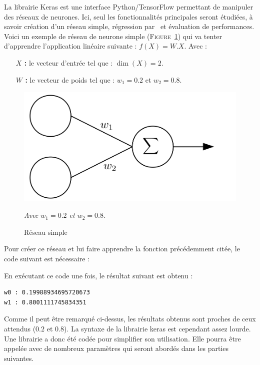La librairie Keras est une interface Python/TensorFlow\cite{tf} permettant de manipuler des réseaux de neurones.
Ici, seul les fonctionnalités principales seront étudiées,
à savoir
création d'un réseau simple,
régression par \sgd\
et évaluation de performances.\\


Voici un exemple de réseau de neurone simple (\textsc{Figure}\ \ref{fig:net2})
qui va tenter d'apprendre l'application linéaire suivante : $f(X) = W.X$.
Avec :
\begin{itemize}
    \item[\textbf{$X$ :}] le vecteur d'entrée tel que : $\dim(X) = 2$.
    \item[\textbf{$W$ :}] le vecteur de poids tel que : $w_1 = 0.2$ et $w_2 = 0.8$.
\end{itemize}
\begin{figure}[H]
    \center
    \includegraphics[height=\petit]{pict/net2.png}
	\caption{Réseau simple}
    \vspace{-10pt}
    \begin{center}
        \tiny
        \textit{
        Avec $w_1 = 0.2$ et $w_2 = 0.8$.
        }
    \end{center}
	\label{fig:net2}
\end{figure}
\vspace{-12pt}


Pour créer ce réseau et lui faire apprendre la fonction précédemment citée,
le code suivant est nécessaire :



En exécutant ce code une fois, le résultat suivant est obtenu :
\begin{lstlisting}
w0 : 0.19988934695720673
w1 : 0.8001111745834351
\end{lstlisting}

Comme il peut être remarqué ci-dessus, les résultats obtenus sont proches de ceux attendus ($0.2$ et $0.8$).
La syntaxe de la librairie keras est cependant assez lourde.
Une librairie a donc été codée pour simplifier son utilisation.
Elle pourra être appelée avec de nombreux paramètres qui seront abordés dans les parties suivantes.\\


